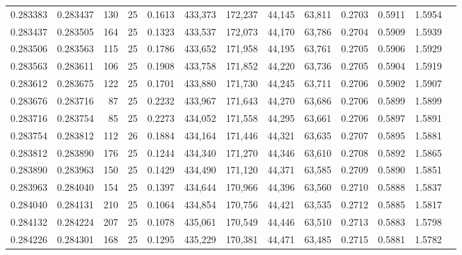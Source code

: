 \begin{tabular}{rrrrrrrrrrrrr}
0.283383 & 0.283437 &   130 &  25 &                                     0.1613 & 433,373 & 172,237 &  44,145 &  63,811 & 0.2703 & 0.5911 & 1.5954 \\
0.283437 & 0.283505 &   164 &  25 &                                     0.1323 & 433,537 & 172,073 &  44,170 &  63,786 & 0.2704 & 0.5909 & 1.5939 \\
0.283506 & 0.283563 &   115 &  25 &                                     0.1786 & 433,652 & 171,958 &  44,195 &  63,761 & 0.2705 & 0.5906 & 1.5929 \\
0.283563 & 0.283611 &   106 &  25 &                                     0.1908 & 433,758 & 171,852 &  44,220 &  63,736 & 0.2705 & 0.5904 & 1.5919 \\
0.283612 & 0.283675 &   122 &  25 &                                     0.1701 & 433,880 & 171,730 &  44,245 &  63,711 & 0.2706 & 0.5902 & 1.5907 \\
0.283676 & 0.283716 &    87 &  25 &                                     0.2232 & 433,967 & 171,643 &  44,270 &  63,686 & 0.2706 & 0.5899 & 1.5899 \\
0.283716 & 0.283754 &    85 &  25 &                                     0.2273 & 434,052 & 171,558 &  44,295 &  63,661 & 0.2706 & 0.5897 & 1.5891 \\
0.283754 & 0.283812 &   112 &  26 &                                     0.1884 & 434,164 & 171,446 &  44,321 &  63,635 & 0.2707 & 0.5895 & 1.5881 \\
0.283812 & 0.283890 &   176 &  25 &                                     0.1244 & 434,340 & 171,270 &  44,346 &  63,610 & 0.2708 & 0.5892 & 1.5865 \\
0.283890 & 0.283963 &   150 &  25 &                                     0.1429 & 434,490 & 171,120 &  44,371 &  63,585 & 0.2709 & 0.5890 & 1.5851 \\
0.283963 & 0.284040 &   154 &  25 &                                     0.1397 & 434,644 & 170,966 &  44,396 &  63,560 & 0.2710 & 0.5888 & 1.5837 \\
0.284040 & 0.284131 &   210 &  25 &                                     0.1064 & 434,854 & 170,756 &  44,421 &  63,535 & 0.2712 & 0.5885 & 1.5817 \\
0.284132 & 0.284224 &   207 &  25 &                                     0.1078 & 435,061 & 170,549 &  44,446 &  63,510 & 0.2713 & 0.5883 & 1.5798 \\
0.284226 & 0.284301 &   168 &  25 &                                     0.1295 & 435,229 & 170,381 &  44,471 &  63,485 & 0.2715 & 0.5881 & 1.5782 \\

\end{tabular}
